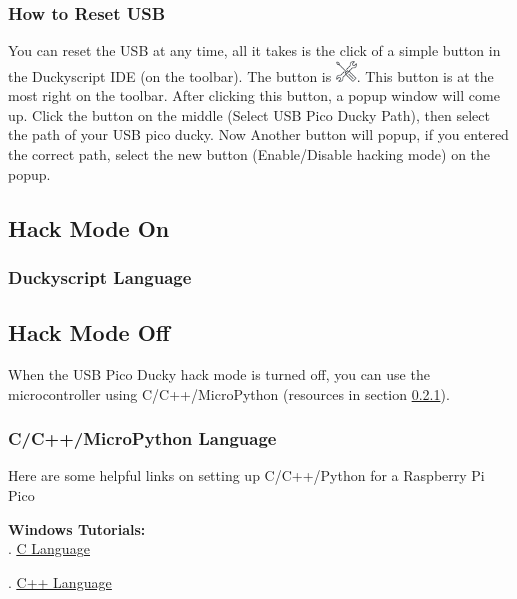 \documentclass[a4paper,12pt]{article}
\begin{document}
\subsubsection{How to Reset USB}\label{how_to_reset}

You can reset the USB at any time, all it takes is the click of a simple button in the Duckyscript IDE (on the toolbar). The button is \includegraphics[width=5.5mm]{pictures/setup.png}. This button is at the most right on the toolbar. After clicking this button, a popup window will come up. Click the button on the middle (Select USB Pico Ducky Path), then select the path of your USB pico ducky. Now Another button will popup, if you entered the correct path, select the new button (Enable/Disable hacking mode) on the popup.

\subsection{Hack Mode On}\label{hack_mode_on}

\subsubsection{Duckyscript Language}

\subsection{Hack Mode Off}\label{hack_mode_off}

When the USB Pico Ducky hack mode is turned off, you can use the microcontroller using C/C++/MicroPython (resources in section \ref{cc_lang}).


\subsubsection{C/C++/MicroPython Language}\label{cc_lang}

Here are some helpful links on setting up C/C++/Python for a Raspberry Pi Pico

\textbf{Windows Tutorials:}\\
\indent{}. \underline{\href{https://www.raspberrypi.com/news/raspberry-pi-pico-windows-installer/}{C Language}}

\indent{}. \underline{\href{https://www.raspberrypi.com/news/raspberry-pi-pico-windows-installer/}{C++ Language}}
\end{document}
